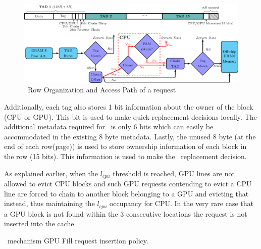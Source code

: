 \begin{figure}[htb]
	\centering
	\includegraphics[scale=0.96]{figures/chaining}
	\caption{\cachename\ Row Organization and Access Path of a request}	
	\label{fig:chain-access}
\end{figure}

Additionally, each tag also stores 1 bit information about the owner of the block (CPU or GPU). This bit is used to make quick replacement decisions locally. The additional metadata required for \chaining\ is only 6 bits which can easily be accommodated in the existing 8 byte metadata. Lastly, the unused 8 byte (at the end of each row(page)) is used to store ownership information of each block in the row (15 bits). This information is used to make the \chaining\ replacement decision.


\par As explained earlier, when the \textit{$l_{cpu}$} threshold is reached, GPU lines are not allowed to evict CPU blocks and such GPU requests contending to evict a CPU line are forced to chain to another block belonging to a GPU and evicting that instead, thus maintaining the \textit{$l_{cpu}$} occupancy for CPU. In the very rare case that a GPU block is not found within the 3 consecutive locations the request is not inserted into the cache.

\begin{table}[htb]
	\centering
	
	\caption{\chaining\ mechanism GPU Fill request insertion policy. }
	\label{chaining-replacement}
\end{table}

